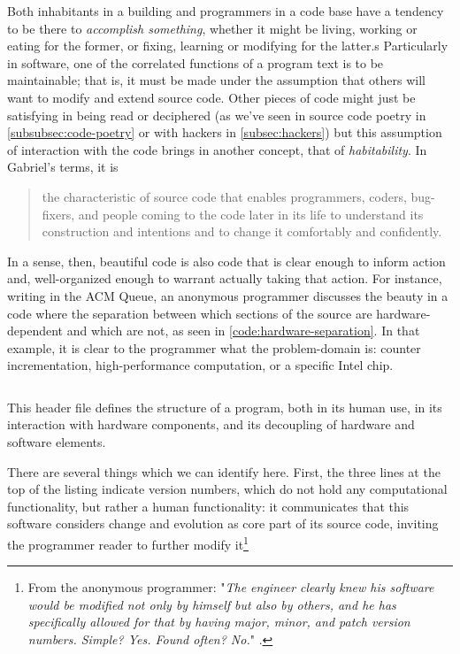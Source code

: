 Both inhabitants in a building and programmers in a code base have a tendency to be there to \emph{accomplish something}, whether it might be living, working or eating for the former, or fixing, learning or modifying for the latter.s Particularly in software, one of the correlated functions of a program text is to be maintainable; that is, it must be made under the assumption that others will want to modify and extend source code. Other pieces of code might just be satisfying in being read or deciphered (as we've seen in source code poetry in \ref{subsubsec:code-poetry} or with hackers in \ref{subsec:hackers}) but this assumption of interaction with the code brings in another concept, that of \emph{habitability}. In Gabriel's terms, it is

\begin{quote}
    the characteristic of source code that enables programmers, coders, bug-fixers, and people coming to the code later in its life to understand its construction and intentions and to change it comfortably and confidently. \citep{gabriel_patterns_1998}
\end{quote}

In a sense, then, beautiful code is also code that is clear enough to inform action and, well-organized enough to warrant actually taking that action. For instance, writing in the ACM Queue, an anonymous programmer discusses the beauty in a code where the separation between which sections of the source are hardware-dependent and which are not, as seen in \ref{code:hardware-separation}. In that example, it is clear to the programmer what the problem-domain is: counter incrementation, high-performance computation, or a specific Intel chip.

\begin{listing}
    \inputminted{c}{./corpus/hardware_separation.h}
    \caption{This header file defines the structure of a program, both in its human use, in its interaction with hardware components, and its decoupling of hardware and software elements.}
    \label{code:hardware-separation}
\end{listing}

There are several things which we can identify here. First, the three lines at the top of the listing indicate version numbers, which do not hold any computational functionality, but rather a human functionality: it communicates that this software considers change and evolution as core part of its source code, inviting the programmer reader to further modify it\footnote{From the anonymous programmer: "\emph{The engineer clearly knew his software would be modified not only by himself but also by others, and he has specifically allowed for that by having major, minor, and patch version numbers. Simple? Yes. Found often? No.}" \citep{vicious_beautiful_2008}.}

